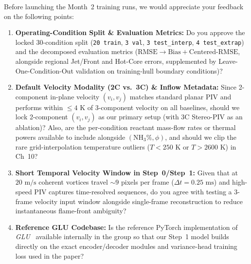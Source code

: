 \documentclass[11pt,letterpaper]{article}
\begin{document}
Before launching the Month~2 training runs, we would appreciate your feedback on the following points:
\begin{enumerate}
    \item \textbf{Operating-Condition Split \& Evaluation Metrics:} Do you approve the locked 30-condition split (\texttt{20 train}, \texttt{3 val}, \texttt{3 test\_interp}, \texttt{4 test\_extrap}) and the decomposed evaluation metrics ($\text{RMSE} \rightarrow \text{Bias} + \text{Centered-RMSE}$, alongside regional Jet/Front and Hot-Core errors, supplemented by Leave-One-Condition-Out validation on training-hull boundary conditions)?
    \item \textbf{Default Velocity Modality (2C vs.\ 3C) \& Inflow Metadata:} Since 2-component in-plane velocity $(v_i, v_j)$ matches standard planar PIV and performs within $\le 4\text{ K}$ of 3-component velocity on all baselines, should we lock 2-component $(v_i, v_j)$ as our primary setup (with 3C Stereo-PIV as an ablation)? Also, are the per-condition reactant mass-flow rates or thermal powers available to include alongside $(\text{NH}_3\%, \phi)$, and should we clip the rare grid-interpolation temperature outliers ($T < 250\text{ K}$ or $T > 2600\text{ K}$) in Ch~10?
    \item \textbf{Short Temporal Velocity Window in Step~0/Step~1:} Given that at $20\text{ m/s}$ coherent vortices travel $\sim 9$ pixels per frame ($\Delta t = 0.25\text{ ms}$) and high-speed PIV captures time-resolved sequences, do you agree with testing a 3-frame velocity input window alongside single-frame reconstruction to reduce instantaneous flame-front ambiguity?
    \item \textbf{Reference GLU Codebase:} Is the reference PyTorch implementation of \textit{GLU}~\cite{wang2026glu} available internally in the group so that our Step~1 model builds directly on the exact encoder/decoder modules and variance-head training loss used in the paper?
\end{enumerate}



\end{document}

